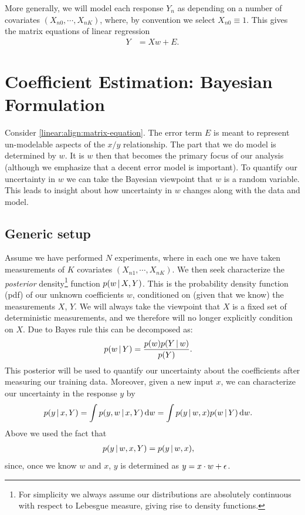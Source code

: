 More generally, we will model each response $Y_n$ as depending on a number of covariates $(X_{n0},\cdots,X_{nK})$, where, by convention we select $X_{n0} \equiv1$.  This gives the matrix equations of linear regression
\begin{align}
  Y &= X w + E.
  \label{linear:align:matrix-equation}
\end{align}

\section{Coefficient Estimation: Bayesian Formulation}
\label{linear:section:bayesian}
Consider \eqref{linear:align:matrix-equation}.  The error term $E$ is meant to represent un-modelable aspects of the $x/y$ relationship.  The part that we do model is determined by $w$.  It is $w$ then that becomes the primary focus of our analysis (although we emphasize that a decent error model is important).  To quantify our uncertainty in $w$ we can take the Bayesian viewpoint that $w$ is a random variable.  This leads to insight about how uncertainty in $w$ changes along with the data and model.

\subsection{Generic setup}
\label{linear:subsection:generic}
Assume we have performed $N$ experiments, where in each one we have taken measurements of $K$ covariates $(X_{n1},\cdots,X_{nK})$.  We then seek characterize the \emph{posterior} density\footnote{For simplicity we always assume our distributions are absolutely continuous with respect to Lebesgue measure, giving rise to density functions.} function $p(w{\,|\,} X,Y)$.  This is the probability density function (pdf) of our unknown coefficients $w$, conditioned on (given that we know) the measurements $X$, $Y$.  We will always take the viewpoint that $X$ is a fixed set of deterministic measurements, and we therefore will no longer explicitly condition on $X$.  Due to Bayes rule this can be decomposed as:
\begin{align}
  p(w{\,|\,} Y) &= \frac{p(w)p(Y{\,|\,} w)}{p(Y)}.
  \label{linear:align:bayes}
\end{align}
This posterior will be used to quantify our uncertainty about the coefficients after measuring our training data.  Moreover, given a new input $x$, we can characterize our uncertainty in the response $y$ by
\begin{align}
  \begin{split}
    p(y{\,|\,} x, Y) &= \int p(y,w{\,|\,} x, Y)\, \mbox{d}w  = \int p(y{\,|\,} w, x)p(w{\,|\,} Y)\, \mbox{d}w.
  \end{split}
  \label{linear:align:predictive}
\end{align}
Above we used the fact that 
\begin{align*}
  p(y{\,|\,} w, x, Y) &= p(y{\,|\,} w, x),
\end{align*}
since, once we know $w$ and $x$, $y$ is determined as $y = x\cdot w + {\epsilon}$.

